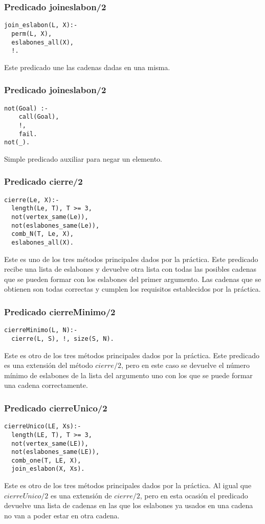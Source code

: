 \documentclass[11pt, a4paper]{article}
\begin{document}
\subsubsection{Predicado joineslabon/2}
\begin{lstlisting}[frame=single]
join_eslabon(L, X):-
  perm(L, X),
  eslabones_all(X),
  !.
\end{lstlisting}
Este predicado une las cadenas dadas en una misma.
\subsubsection{Predicado joineslabon/2}
\begin{lstlisting}[frame=single]
not(Goal) :-
    call(Goal),
    !,
    fail.
not(_).
\end{lstlisting}
Simple predicado auxiliar para negar un elemento.
\subsubsection{Predicado cierre/2}
\begin{lstlisting}[frame=single]
cierre(Le, X):-
  length(Le, T), T >= 3,
  not(vertex_same(Le)),
  not(eslabones_same(Le)),
  comb_N(T, Le, X),
  eslabones_all(X).
\end{lstlisting}
Este es uno de los tres métodos principales dados por la práctica.
Este predicado recibe una lista de eslabones y devuelve otra lista con todas las posibles cadenas que se pueden formar con los eslabones del primer argumento.
Las cadenas que se obtienen son todas correctas y cumplen los requisitos establecidos por la práctica.
\subsubsection{Predicado cierreMinimo/2}
\begin{lstlisting}[frame=single]
cierreMinimo(L, N):-
  cierre(L, S), !, size(S, N).
\end{lstlisting}
Este es otro de los tres métodos principales dados por la práctica.
Este predicado es una extensión del método $cierre/2$, pero en este caso se devuelve el número mínimo de eslabones de la lista del argumento uno con los que se puede formar una cadena correctamente.
\subsubsection{Predicado cierreUnico/2}
\begin{lstlisting}[frame=single]
cierreUnico(LE, Xs):-
  length(LE, T), T >= 3,
  not(vertex_same(LE)),
  not(eslabones_same(LE)),
  comb_one(T, LE, X),
  join_eslabon(X, Xs).
\end{lstlisting}
Este es otro de los tres métodos principales dados por la práctica.
Al igual que $cierreUnico/2$ es una extensión de $cierre/2$, pero en esta ocasión el predicado devuelve una lista de cadenas en las que los eslabones ya usados en una cadena no van a poder estar en otra cadena.
\end{document}
